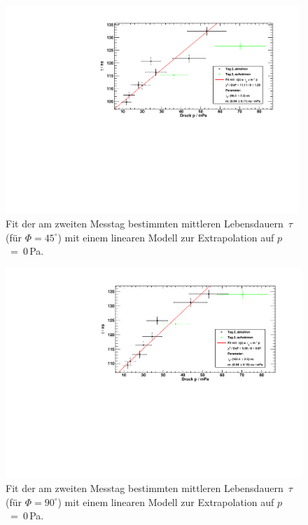 \begin{figure}[H]
\begin{center}
  \includegraphics[width=0.99\textwidth]{../img/taus_45_day2.pdf}
  \caption{Fit der am zweiten Messtag bestimmten mittleren Lebensdauern~$\tau$ (für $\Phi=45^\circ$) mit einem linearen Modell
  zur Extrapolation auf \mbox{$p$ = 0\,Pa}.}
  \label{img:taus:day2:45}
\end{center}
\end{figure}

\begin{figure}[H]
\begin{center}
  \includegraphics[width=\textwidth]{../img/taus_90_day2.pdf}
  \caption{Fit der am zweiten Messtag bestimmten mittleren Lebensdauern~$\tau$ (für $\Phi=90^\circ$) mit einem linearen Modell
  zur Extrapolation auf \mbox{$p$ = 0\,Pa}.}
  \label{img:taus:day2:90}
\end{center}
\end{figure}


